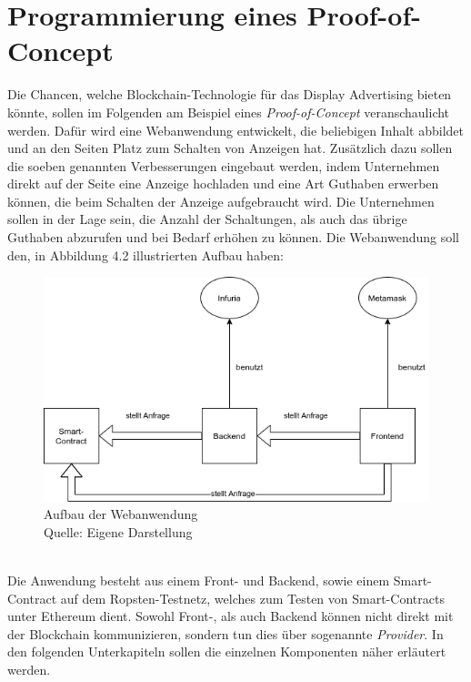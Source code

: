 \section{Programmierung eines Proof-of-Concept}
Die Chancen, welche Blockchain-Technologie für das Display Advertising bieten könnte, sollen im Folgenden am Beispiel eines \emph{Proof-of-Concept} veranschaulicht werden. 
Dafür wird eine Webanwendung entwickelt, die beliebigen Inhalt abbildet und an den Seiten Platz zum Schalten von Anzeigen hat. 
Zusätzlich dazu sollen die soeben genannten Verbesserungen eingebaut werden, indem Unternehmen direkt auf der Seite eine Anzeige hochladen und eine Art Guthaben erwerben können, die beim Schalten der Anzeige aufgebraucht wird. Die Unternehmen sollen in der Lage sein, die Anzahl der Schaltungen, als auch das übrige Guthaben abzurufen und bei Bedarf erhöhen zu können. Die Webanwendung soll den, in Abbildung 4.2 illustrierten Aufbau haben:
\begin{figure}[htpb]
	\centering
	\includegraphics[width=\textwidth]{images/aufbau_PoC.png}
	\caption{Aufbau der Webanwendung\\
	Quelle: Eigene Darstellung}
	\label{6braun:fig:aufbau_poc}
\end{figure}\\
Die Anwendung besteht aus einem Front- und Backend, sowie einem Smart-Contract auf dem Ropsten-Testnetz, welches zum Testen von Smart-Contracts unter Ethereum dient. Sowohl Front-, als auch Backend können nicht direkt mit der Blockchain kommunizieren, sondern tun dies über sogenannte \emph{Provider}. In den folgenden Unterkapiteln sollen die einzelnen Komponenten näher erläutert werden.
